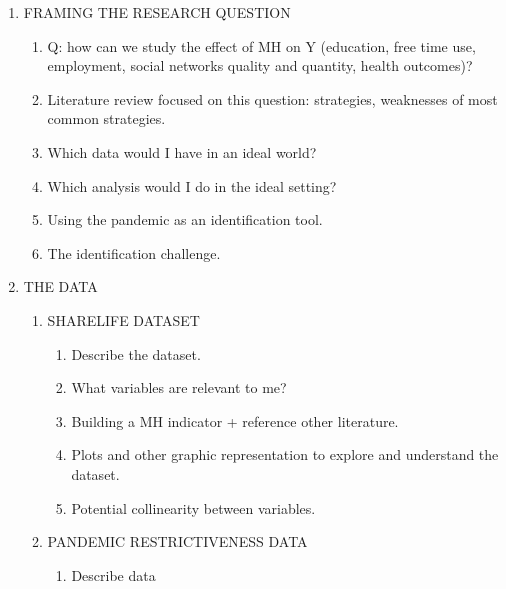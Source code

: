 \documentclass{article}
\begin{document}
\begin{enumerate}
    \item FRAMING THE RESEARCH QUESTION
    \begin{enumerate}
        \item Q: how can we study the effect of MH on Y (education, free time use, employment, social networks quality and quantity, health outcomes)?
        \item Literature review focused on this question: strategies, weaknesses of most common strategies.
        \item Which data would I have in an ideal world?
        \item Which analysis would I do in the ideal setting?
        \item Using the pandemic as an identification tool. 
        \item The identification challenge. 
    \end{enumerate}

    \item THE DATA
    \begin{enumerate}
        \item SHARELIFE DATASET 
        \begin{enumerate}
        \item Describe the dataset.
        \item What variables are relevant to me?
        \item Building a MH indicator + reference other literature.
        \item Plots and other graphic representation to explore and understand the dataset. 
        \item Potential collinearity between variables. 
        \end{enumerate}
        \item PANDEMIC RESTRICTIVENESS DATA
        \begin{enumerate}
            \item Describe data 
        \end{enumerate}
    \end{enumerate}
        


\end{enumerate}
\end{document}
